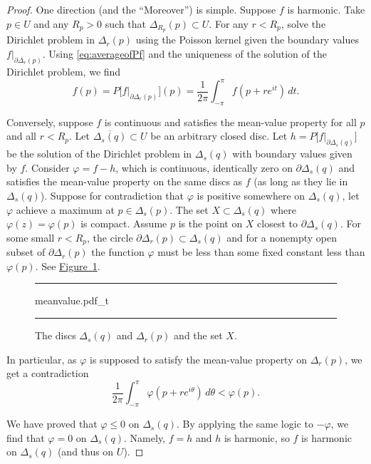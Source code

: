 \documentclass[12pt,openany]{book}
\newcommand{\myquote}[1]{``#1''}
\theoremstyle{plain}
\theoremstyle{remark}
\theoremstyle{definition}
\newenvironment{myfig}{%
\begin{figure}[h!t]
\noindent\rule{\textwidth}{0.5pt}\vspace{12pt}\par\centering}%
{\par\noindent\rule{\textwidth}{0.5pt}
\end{figure}}
\theoremstyle{exercise}
\theoremstyle{example}
\newcommand{\figureref}[1]{\hyperref[#1]{Figure~\ref*{#1}}}
\begin{document}
\begin{proof}
One direction (and the \myquote{Moreover}) is simple.
Suppose $f$ is harmonic.
Take $p \in U$ and
any $R_p > 0$ such that $\Delta_{R_p}(p) \subset U$.
For any $r < R_p$,
solve the Dirichlet problem in $\Delta_r(p)$ using the Poisson kernel
given the boundary values
$f|_{\partial \Delta_r(p)}$.  Using \eqref{eq:averageofPf} and the
uniqueness of the solution of the Dirichlet problem, we find
\begin{equation*}
f(p) = P\bigl[f|_{\partial \Delta_r(p)}\big](p) =
\frac{1}{2\pi} \int_{-\pi}^{\pi}f(p + r e^{it}) \, dt .
\end{equation*}

Conversely, suppose $f$ is continuous and satisfies the
mean-value property for all $p$ and all $r < R_p$.
Let $\overline{\Delta_s(q)} \subset U$ be an
arbitrary closed disc.  Let $h = P\bigl[f|_{\partial \Delta_s(q)}\big]$
be the solution of the Dirichlet problem in $\Delta_s(q)$ with boundary
values given by $f$.  Consider $\varphi = f-h$,
which is continuous, identically zero
on $\partial \Delta_s(q)$ and satisfies the mean-value property
on the same discs as $f$ (as long as they lie in $\Delta_s(q)$).
Suppose for contradiction that $\varphi$ is positive
somewhere on $\Delta_s(q)$, let $\varphi$ achieve a maximum at $p \in
\Delta_s(p)$.
The set $X \subset \Delta_s(q)$ where $\varphi(z) = \varphi(p)$ is compact.
Assume $p$ is the point on $X$ closest to
$\partial \Delta_s(q)$.  For some small $r < R_p$, the circle
$\partial \Delta_r(p) \subset \Delta_s(q)$ and for a nonempty open subset
of $\partial \Delta_r(p)$ the function $\varphi$ must be less than some fixed
constant less than $\varphi(p)$.  See \figureref{fig:meanvalue}.

\begin{myfig}
{meanvalue.pdf_t}
\caption{The discs $\Delta_s(q)$ and $\Delta_r(p)$ and the set
$X$.\label{fig:meanvalue}}
\end{myfig}

In particular, as 
$\varphi$ is supposed to satisfy the
mean-value property on $\Delta_r(p)$, we get a contradiction
\begin{equation*}
\frac{1}{2\pi} \int_{-\pi}^{\pi} \varphi(p+re^{i\theta})\, d\theta <
\varphi(p) .
\end{equation*}

We have proved that $\varphi \leq 0$ on $\Delta_s(q)$.  By applying the same
logic to $-\varphi$, we find that $\varphi = 0$ on $\Delta_s(q)$.
Namely, $f=h$ and $h$ is harmonic, so $f$ is harmonic on
$\Delta_s(q)$ (and thus on $U$).
\end{proof}
\end{document}
